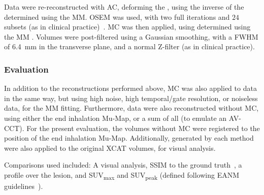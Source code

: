                 Data were re-reconstructed with \gls{AC}, deforming the , using the inverse of the  determined using the \gls{MM}. %
                \gls{OSEM} was used, with two full iterations and $24$ subsets (as in clinical practice)~\parencite{Hudson1994}. \gls{MC} was then applied, using  determined using the \gls{MM}%
                . Volumes were post-filtered using a Gaussian smoothing, with a \gls{FWHM} of \SI{6.4}{\milli\metre} in the transverse plane, and a normal Z-filter (as in clinical practice).
            
            
            \subsubsection{Evaluation} \label{sec:pet_ct_motion_correction_exploiting_motion_models_fit_on_coarsely_gated_data_applied_to_finely_gated_data_methods_evaluation}
                In addition to the reconstructions performed %
                above, \gls{MC} was also applied to data in the same way, %
                but using high noise, high temporal/gate resolution, or noiseless data, for the \gls{MM} fitting. Furthermore, data were also reconstructed without \gls{MC}, using either the end inhalation \gls{Mu-Map}, or a sum of all  (to emulate an \gls{AV-CCT}). For the present evaluation, the volumes without \gls{MC} were registered to the position of the end inhalation \gls{Mu-Map}. Additionally,  generated by each method were also applied to the original \gls{XCAT} volumes, for visual analysis.
                
                Comparisons used included: A visual analysis, \gls{SSIM} to the ground truth~\parencite{Wang2009MeanMeasures}, a profile over the lesion, and \gls{SUV}\textsubscript{max} and \gls{SUV}\textsubscript{peak} (defined following \gls{EANM} guidelines~\parencite{Boellaard2015FDG2.0}).
        
        
